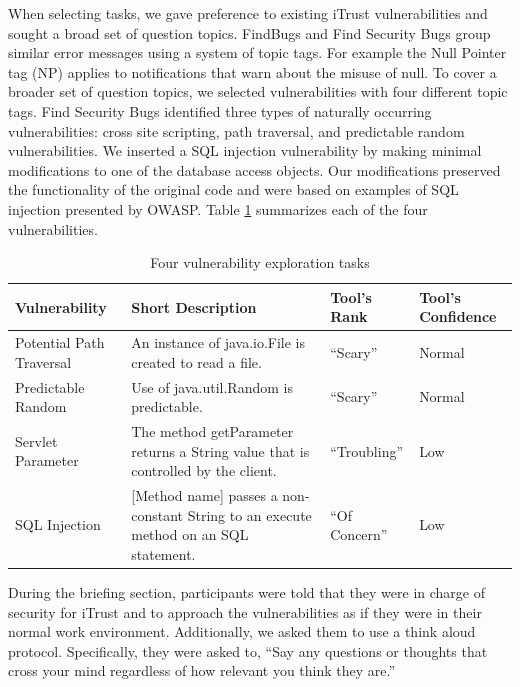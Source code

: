 \documentclass[conference]{IEEEtran}
\begin{document}
When selecting tasks, we gave preference to existing iTrust vulnerabilities and sought a broad set of question topics.  
FindBugs and Find Security Bugs group similar error messages using a system of topic tags. For example the Null Pointer tag (NP) applies to notifications that warn about the misuse of null. 
To cover a broader set of question topics, we selected vulnerabilities with four different topic tags.
Find Security Bugs identified three types of naturally occurring vulnerabilities: cross site scripting, path traversal, and predictable random vulnerabilities.
We inserted a SQL injection vulnerability by making minimal modifications to one of the database access objects.
Our modifications preserved the functionality of the original code and were based on examples of SQL injection presented by OWASP.
Table \ref{table:vulnerabilities} summarizes each of the four vulnerabilities. 

\begin{table} 
\centering
\caption{Four vulnerability exploration tasks}
\begin{tabular}{|l|l|l|l|}
\rowcolor{gray!50}
\hline
    Vulnerability				& Short Description													& Tool's Rank 						& Tool's Confidence\\
    \hline	
    Potential Path Traversal	& An instance of java.io.File is created to read a file.     			& ``Scary''							 	&  Normal\\
    \hline
    Predictable Random			& Use of java.util.Random is predictable. 								& ``Scary''								&  Normal\\
    \hline
    Servlet Parameter 			& The method getParameter returns a String value that is controlled by the client.			& ``Troubling''		&  Low\\
    \hline
    SQL Injection				& [Method name] passes a non-constant String to an execute method on an SQL statement.     	& ``Of Concern''		&  Low\\
    \hline
\end{tabular}
\label{table:vulnerabilities}
\end{table}

During the briefing section, participants were told that they were in charge of security for iTrust and to approach the vulnerabilities as if they were in their normal work environment.
Additionally, we asked them to use a think aloud protocol. Specifically, they were asked to, ``Say any questions or thoughts that cross your mind regardless of how relevant you think they are.''
\end{document}
